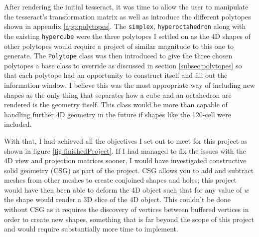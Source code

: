 \documentclass[11pt, a4paper]{article}
\begin{document}
After rendering the initial tesseract, it was time to allow the user to manipulate the tesseract's transformation matrix as well as introduce the different polytopes shown in appendix \ref{app:polytopes}. The \texttt{simplex}, \texttt{hyperoctahedron} along with the existing \texttt{hypercube} were the three polytopes I settled on as the 4D shapes of other polytopes would require a project of similar magnitude to this one to generate. The \texttt{Polytope} class was then introduced to give the three chosen polytopes a base class to override as discussed in section \ref{subsec:polytopes} so that each polytope had an opportunity to construct itself and fill out the information window. I believe this was the most appropriate way of including new shapes as the only thing that separates how a cube and an octahedron are rendered is the geometry itself. This class would be more than capable of handling further 4D geometry in the future if shapes like the 120-cell were included.

With that, I had achieved all the objectives I set out to meet for this project as shown in figure \ref{fig:finishedProject}. If I had managed to fix the issues with the 4D view and projection matrices sooner, I would have investigated constructive solid geometry (CSG) as part of the project. CSG allows you to add and subtract meshes from other meshes to create conjoined shapes and holes; this project would have then been able to deform the 4D object such that for any value of $w$ the shape would render a 3D slice of the 4D object. This couldn't be done without CSG as it requires the discovery of vertices between buffered vertices in order to create new shapes, something that is far beyond the scope of this project and would require substantially more time to implement.

\cleardoublepage
\printbibliography[
  heading=bibintoc,
  title={Bibliography}
]
\end{document}
